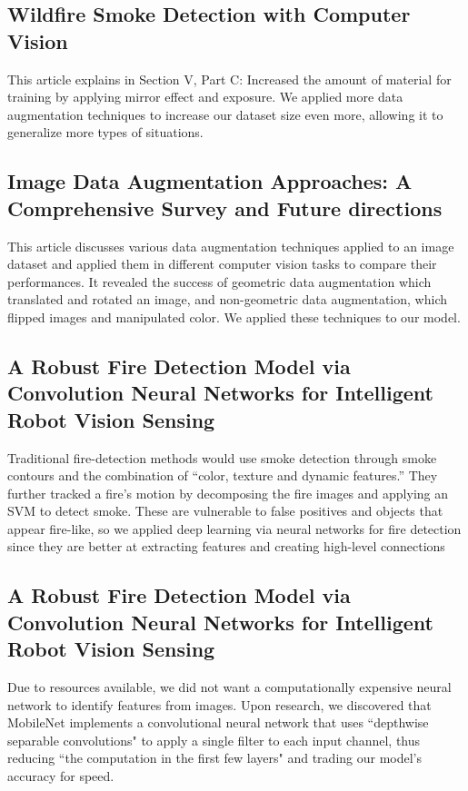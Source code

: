 \subsection{Wildfire Smoke Detection with Computer Vision
	~\citep{Daniel}}

This article explains in Section V, Part C: Increased the amount of material for training by applying mirror effect and exposure. We applied more data augmentation techniques to increase our dataset size even more, allowing it to generalize more types of situations.

\subsection{Image Data Augmentation Approaches: A Comprehensive Survey and Future directions~\citep{kumar2023image}}

This article discusses various data augmentation techniques applied to an image dataset and applied them in different computer vision tasks to compare their performances. It revealed the success of geometric data augmentation which translated and rotated an image, and non-geometric data augmentation, which flipped images and manipulated color. We applied these techniques to our model.

\subsection{A Robust Fire Detection Model via Convolution Neural Networks for Intelligent Robot Vision Sensing~\citep{s22082929}}

Traditional fire-detection methods would use smoke detection through smoke contours and the combination of ``color, texture and dynamic features.'' They further tracked a fire's motion by decomposing the fire images and applying an SVM to detect smoke.
These are vulnerable to false positives and objects that appear fire-like, so we applied deep learning via neural networks for fire detection since they are better at extracting features and creating high-level connections

\subsection{A Robust Fire Detection Model via Convolution Neural Networks for Intelligent Robot Vision Sensing~\citep{howard2017mobilenets}}

Due to resources available, we did not want a computationally expensive neural network to identify features from images. Upon research, we discovered that MobileNet implements a convolutional neural network that uses ``depthwise separable convolutions" to apply a single filter to each input channel, thus reducing ``the computation in the first few layers" and trading our model's accuracy for speed.

